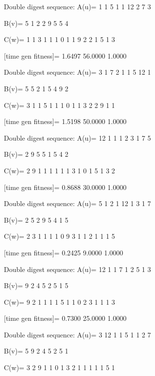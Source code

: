 Double digest sequence:
A(u)=
     1     1     5     1     1    12     2     7     3

B(v)=
     5     1     2     2     9     5     5     4

C(w)=
     1     1     3     1     1     1     0     1     1     9     2     2     1     5     1     3

[time gen fitness]=
    1.6497   56.0000    1.0000

Double digest sequence:
A(u)=
     3     1     7     2     1     1     5    12     1

B(v)=
     5     5     2     1     5     4     9     2

C(w)=
     3     1     1     5     1     1     1     0     1     1     3     2     2     9     1     1

[time gen fitness]=
    1.5198   50.0000    1.0000

Double digest sequence:
A(u)=
    12     1     1     1     2     3     1     7     5

B(v)=
     2     9     5     5     1     5     4     2

C(w)=
     2     9     1     1     1     1     1     1     3     1     0     1     5     1     3     2

[time gen fitness]=
    0.8688   30.0000    1.0000

Double digest sequence:
A(u)=
     5     1     2     1    12     1     3     1     7

B(v)=
     2     5     2     9     5     4     1     5

C(w)=
     2     3     1     1     1     1     0     9     3     1     1     2     1     1     1     5

[time gen fitness]=
    0.2425    9.0000    1.0000

Double digest sequence:
A(u)=
    12     1     1     7     1     2     5     1     3

B(v)=
     9     2     4     5     2     5     1     5

C(w)=
     9     2     1     1     1     1     5     1     1     0     2     3     1     1     1     3

[time gen fitness]=
    0.7300   25.0000    1.0000

Double digest sequence:
A(u)=
     3    12     1     1     5     1     1     2     7

B(v)=
     5     9     2     4     5     2     5     1

C(w)=
     3     2     9     1     1     0     1     3     2     1     1     1     1     1     5     1

